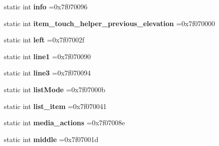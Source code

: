 \begin{DoxyCompactItemize}
static int {\bfseries info} =0x7f070096
\item 
\mbox{\label{classandroid_1_1support_1_1v7_1_1cardview_1_1R_1_1id_ac619f41bb482609825759f02fddba508}} 
static int {\bfseries item\+\_\+touch\+\_\+helper\+\_\+previous\+\_\+elevation} =0x7f070000
\item 
\mbox{\label{classandroid_1_1support_1_1v7_1_1cardview_1_1R_1_1id_ada858890c60e3acd1d6451a62d1baea3}} 
static int {\bfseries left} =0x7f07002f
\item 
\mbox{\label{classandroid_1_1support_1_1v7_1_1cardview_1_1R_1_1id_a0d973ae86e320dea70e627df578e362e}} 
static int {\bfseries line1} =0x7f070090
\item 
\mbox{\label{classandroid_1_1support_1_1v7_1_1cardview_1_1R_1_1id_aad2025c805d53ed962977cb48d7658ba}} 
static int {\bfseries line3} =0x7f070094
\item 
\mbox{\label{classandroid_1_1support_1_1v7_1_1cardview_1_1R_1_1id_a0363b01a059d5a5c3d625dde4ec8ebae}} 
static int {\bfseries list\+Mode} =0x7f07000b
\item 
\mbox{\label{classandroid_1_1support_1_1v7_1_1cardview_1_1R_1_1id_a41a782b87d01211fbd79bf47bc9a205b}} 
static int {\bfseries list\+\_\+item} =0x7f070041
\item 
\mbox{\label{classandroid_1_1support_1_1v7_1_1cardview_1_1R_1_1id_a796fcac238a32ab7ba882473c0655a2a}} 
static int {\bfseries media\+\_\+actions} =0x7f07008e
\item 
\mbox{\label{classandroid_1_1support_1_1v7_1_1cardview_1_1R_1_1id_a5c10cce7f8364c96e30029ee1f33ac5c}} 
static int {\bfseries middle} =0x7f07001d
\item 
\mbox{\label{classandroid_1_1support_1_1v7_1_1cardview_1_1R_1_1id_ab7df8c378ce7c9f2ca7f1def8bfcb0b3}} 

\end{DoxyCompactItemize}
